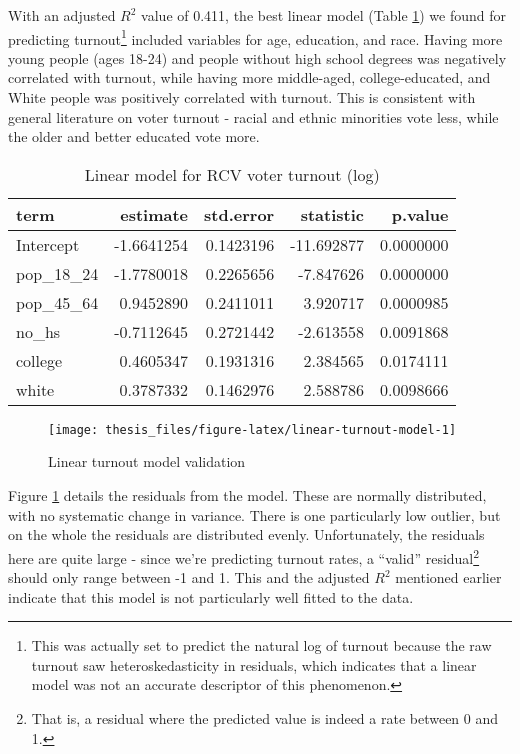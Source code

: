 \documentclass[12pt,twoside]{reedthesis}
\begin{document}
With an adjusted \(R^2\) value of 0.411, the best linear model (Table \ref{tab:linear-turnout-model}) we found for predicting turnout\footnote{This was actually set to predict the natural log of turnout because the raw turnout saw heteroskedasticity in residuals, which indicates that a linear model was not an accurate descriptor of this phenomenon.} included variables for age, education, and race. Having more young people (ages 18-24) and people without high school degrees was negatively correlated with turnout, while having more middle-aged, college-educated, and White people was positively correlated with turnout. This is consistent with general literature on voter turnout - racial and ethnic minorities vote less, while the older and better educated vote more.
\begin{table}[t]

\caption[Linear turnout model]{\label{tab:linear-turnout-model}Linear model for RCV voter turnout (log)}
\centering
\begin{tabular}{lrrrr}
\toprule
term & estimate & std.error & statistic & p.value\\
\midrule
Intercept & -1.6641254 & 0.1423196 & -11.692877 & 0.0000000\\
pop\_18\_24 & -1.7780018 & 0.2265656 & -7.847626 & 0.0000000\\
pop\_45\_64 & 0.9452890 & 0.2411011 & 3.920717 & 0.0000985\\
no\_hs & -0.7112645 & 0.2721442 & -2.613558 & 0.0091868\\
college & 0.4605347 & 0.1931316 & 2.384565 & 0.0174111\\
\addlinespace
white & 0.3787332 & 0.1462976 & 2.588786 & 0.0098666\\
\bottomrule
\end{tabular}
\end{table}
\begin{figure}
\texttt{[image: thesis\_files/figure-latex/linear-turnout-model-1]} \caption{Linear turnout model validation}\label{fig:linear-turnout-model}
\end{figure}
Figure \ref{fig:linear-turnout-model} details the residuals from the model. These are normally distributed, with no systematic change in variance. There is one particularly low outlier, but on the whole the residuals are distributed evenly. Unfortunately, the residuals here are quite large - since we're predicting turnout rates, a ``valid'' residual\footnote{That is, a residual where the predicted value is indeed a rate between 0 and 1.} should only range between -1 and 1. This and the adjusted \(R^2\) mentioned earlier indicate that this model is not particularly well fitted to the data.
\end{document}
